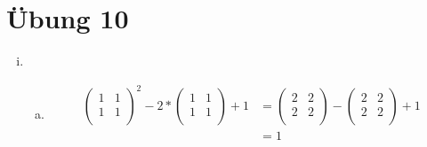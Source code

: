 \documentclass{article}
\begin{document}
\section*{Übung 10}
\begin{enumerate}[(i)]
\item
  \begin{enumerate}[a)]
  \item
    \begin{align*}
      \left(
        \begin{array}{cc}
          1 & 1 \\
          1 & 1 \\
        \end{array}
      \right)^2
      - 2 *
      \left(
        \begin{array}{cc}
          1 & 1 \\
          1 & 1 \\
        \end{array}
      \right)
      + 1
      &=
      \left(
        \begin{array}{cc}
          2 & 2 \\
          2 & 2 \\
        \end{array}
      \right)
      - 
      \left(
        \begin{array}{cc}
          2 & 2 \\
          2 & 2 \\
        \end{array}
      \right)
      + 1 \\
      &= 1\\
    \end{align*}


\end{enumerate}
\end{enumerate}
\end{document}
